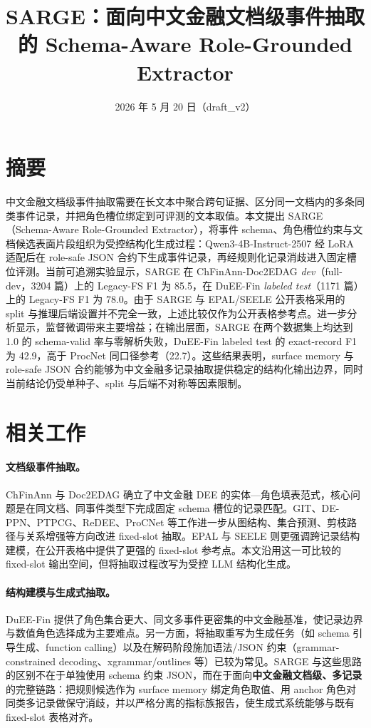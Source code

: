 \documentclass[UTF8,fontset=none,11pt]{ctexart}
\title{SARGE：面向中文金融文档级事件抽取的 Schema-Aware Role-Grounded Extractor}
\author{}
\date{2026 年 5 月 20 日（draft\_v2）}
\begin{document}
\sloppy
\setlength{\emergencystretch}{2em}
\maketitle

\section{摘要}

中文金融文档级事件抽取需要在长文本中聚合跨句证据、区分同一文档内的多条同类事件记录，并把角色槽位绑定到可评测的文本取值。本文提出 SARGE（Schema-Aware Role-Grounded Extractor），将事件 schema、角色槽位约束与文档候选表面片段组织为受控结构化生成过程：Qwen3-4B-Instruct-2507 经 LoRA 适配后在 role-safe JSON 合约下生成事件记录，再经规则化记录消歧进入固定槽位评测。当前可追溯实验显示，SARGE 在 ChFinAnn-Doc2EDAG \emph{dev}（full-dev，3204 篇）上的 Legacy-FS F1 为 85.5，在 DuEE-Fin \emph{labeled test}（1171 篇）上的 Legacy-FS F1 为 78.0。由于 SARGE 与 EPAL/SEELE 公开表格采用的 split 与推理后端设置并不完全一致，上述比较仅作为公开表格参考点。进一步分析显示，监督微调带来主要增益；在输出层面，SARGE 在两个数据集上均达到 1.0 的 schema-valid 率与零解析失败，DuEE-Fin labeled test 的 exact-record F1 为 42.9，高于 ProcNet 同口径参考（22.7）。这些结果表明，surface memory 与 role-safe JSON 合约能够为中文金融多记录抽取提供稳定的结构化输出边界，同时当前结论仍受单种子、split 与后端不对称等因素限制。

\section{相关工作}

\paragraph{文档级事件抽取。}
ChFinAnn 与 Doc2EDAG 确立了中文金融 DEE 的实体—角色填表范式，核心问题是在同文档、同事件类型下完成固定 schema 槽位的记录匹配。GIT、DE-PPN、PTPCG、ReDEE、ProCNet 等工作进一步从图结构、集合预测、剪枝路径与关系增强等方向改进 fixed-slot 抽取。EPAL 与 SEELE 则更强调跨记录结构建模，在公开表格中提供了更强的 fixed-slot 参考点。本文沿用这一可比较的 fixed-slot 输出空间，但将抽取过程改写为受控 LLM 结构化生成。

\paragraph{结构建模与生成式抽取。}
DuEE-Fin 提供了角色集合更大、同文多事件更密集的中文金融基准，使记录边界与数值角色选择成为主要难点。另一方面，将抽取重写为生成任务（如 schema 引导生成、function calling）以及在解码阶段施加语法/JSON 约束（grammar-constrained decoding、xgrammar/outlines 等）已较为常见。SARGE 与这些思路的区别不在于单独使用 schema 约束 JSON，而在于面向\textbf{中文金融文档级、多记录}的完整链路：把规则候选作为 surface memory 绑定角色取值、用 anchor 角色对同类多记录做保守消歧，并以严格分离的指标族报告，使生成式系统能够与既有 fixed-slot 表格对齐。
\end{document}
